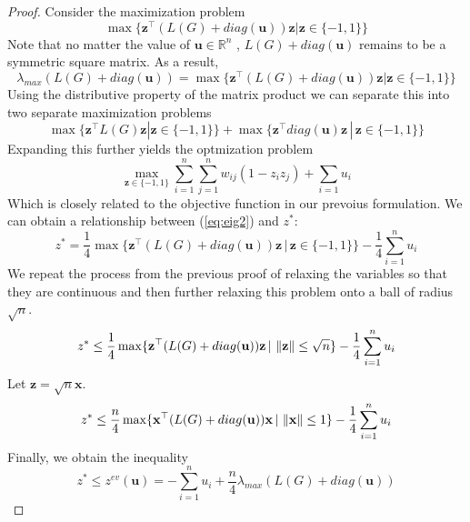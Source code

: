 \documentclass[12pt]{article}
\theoremstyle{plain}
\theoremstyle{definition}
\begin{document}
\begin{proof}
    Consider the maximization problem
    \[
        \max\lbrace \mathbf{z}^\top (L(G) + diag(\mathbf{u})) \mathbf{z} | \mathbf{z} \in \lbrace -1,1\rbrace \rbrace
    \]
    Note that no matter the value of $\mathbf{u} \in \mathbb{R}^n$ , $L(G) + diag(\mathbf{u})$ remains to be a symmetric square matrix. As a result,
    \[
        \lambda_{max}(L(G) + diag(\mathbf{u})) = \max\lbrace \mathbf{z}^\top (L(G) + diag(\mathbf{u})) \mathbf{z} | \mathbf{z} \in \lbrace -1,1\rbrace \rbrace
    \]
    Using the distributive property of the matrix product we can separate this into two separate maximization problems
    \[
        \max\lbrace \mathbf{z}^\top L(G) \mathbf{z} | \mathbf{z} \in \lbrace -1,1\rbrace \rbrace  +  \max\lbrace \mathbf{z}^\top diag(\mathbf{u}) \mathbf{z}\, |\, \mathbf{z} \in \lbrace -1,1\rbrace \rbrace
    \] 
    Expanding this further yields the optmization problem
    \begin{equation}
        \max_{\mathbf{z} \in \lbrace -1, 1\rbrace} \sum_{i = 1}^n \sum_{j=1}^n w_{ij} (1 - z_i z_j) + \sum_{i = 1} u_i \label{eq:eig2}
    \end{equation}
    Which is closely related to the objective function in our prevoius formulation. We can obtain a relationship between (\ref{eq:eig2}) and $z^*$:
    \[
      z^* = \frac{1}{4} \max\lbrace \mathbf{z}^\top (L(G) + diag(\mathbf{u})) \mathbf{z} \,|\, \mathbf{z} \in \lbrace -1,1\rbrace \rbrace - \frac{1}{4}\sum_{i=1}^n u_i   
    \]
    We repeat the process from the previous proof of relaxing the variables so that they are continuous and then further relaxing this problem onto a ball of radius $\sqrt{n}$.
    \[
        z^* \leq \frac{1}{4} \max\lbrace \mathbf{z}^\top (L(G) + diag(\mathbf{u})) \mathbf{z} \,|\, \left\lVert\mathbf{z}\right\rVert \leq \sqrt{n} \rbrace - \frac{1}{4}\sum_{i=1}^n u_i
    \]
    Let $\mathbf{z} = \sqrt{n} \mathbf{x}$. 
    \[
        z^* \leq \frac{n}{4} \max\lbrace \mathbf{x}^\top (L(G) + diag(\mathbf{u})) \mathbf{x} \,|\, \left\lVert\mathbf{x}\right\rVert \leq 1\rbrace - \frac{1}{4}\sum_{i=1}^n u_i
    \]
    Finally, we obtain the inequality
    \begin{equation}
        z^* \leq z^{ev}(\mathbf{u}) = -\sum_{i=1}^n u_i + \dfrac{n}{4} \lambda_{max}(L(G) + diag(\mathbf{u}))
    \end{equation}
\end{proof}
\end{document}
